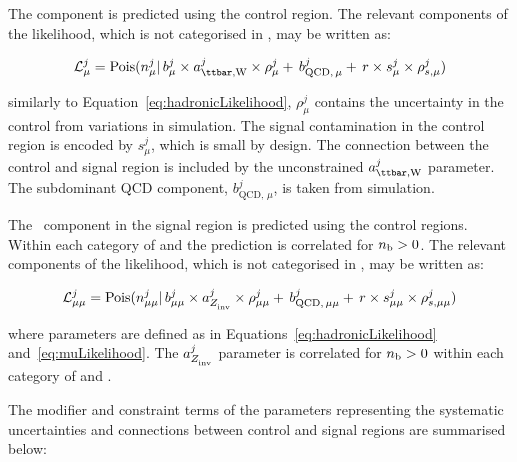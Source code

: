 The \ttw component is predicted using the \mj control region. The relevant 
components of the likelihood, which is not categorised in \mht, may be written as:

\begin{equation}
\label{eq:muLikelihood}
\mathcal{L}^{j}_{\mu} = \mathrm{Pois}(n^{j}_{\mu} |\, b^{j}_{\mu}\times a_{\ttw}^{j}\times\rho^{j}_{\mu} +\, b^{j}_{\text{QCD},\,\mu} + \,r \times s^{j}_{\mu}\times\rho^{j}_{s,\mu})
\end{equation}

similarly to Equation~\ref{eq:hadronicLikelihood}, $\rho^{j}_{\mu}$ contains the uncertainty in the control \htcat from variations in simulation. 
The signal contamination in the control region is encoded by $s^{j}_{\mu}$, which is small by design. 
The connection between the control and signal region
is included by the unconstrained $a_{\ttw}^{j}$ parameter. The 
subdominant QCD component, $b^{j}_{\text{QCD},\,\mu}$, is taken from simulation. 

The \zInv~component in the signal region is predicted using the \mmj control regions. 
Within each category of \nj and \scalht the prediction is correlated 
for  $n_{\text{b}} > 0$. The relevant components of the likelihood, which is not categorised in \mht, may be written as:

\begin{equation}
\label{eq:mumuLikelihood}
\mathcal{L}^{j}_{\mu\mu} = \mathrm{Pois}(n^{j}_{\mu\mu} |\, b^{j}_{\mu\mu}\times a_{Z_{\rm inv}^{~}}^{j}\times\rho^{j}_{\mu\mu} +\, b^{j}_{\text{QCD},\,\mu\mu} + \,r \times s^{j}_{\mu\mu}\times\rho^{j}_{s,\mu\mu})
\end{equation}

where parameters are defined as in Equations~\ref{eq:hadronicLikelihood} and~\ref{eq:muLikelihood}. 
The $a_{Z_{\rm inv}^{~}}^{j}$ parameter is correlated for $n_{\text{b}} > 0$ within each 
category of \nj and \scalht.

The modifier and constraint terms of the parameters representing the systematic uncertainties and 
connections between control and signal regions are summarised below:

